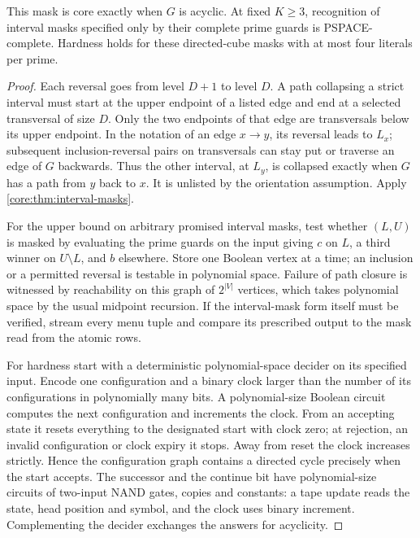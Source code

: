 \begin{proposition}
\label{core:prop:compact-cube-masks}
This mask is core exactly when $G$ is acyclic. At fixed $K\ge3$,
recognition of interval masks specified only by their complete prime
guards is PSPACE-complete. Hardness holds for these directed-cube
masks with at most four literals per prime.
\end{proposition}
\begin{proof}
Each reversal goes from level $D+1$ to level $D$. A path collapsing
a strict interval must start at the upper endpoint of a listed edge
and end at a selected transversal of size $D$. Only the two endpoints
of that edge are transversals below its upper endpoint. In the
notation of an edge $x\to y$, its reversal leads to $L_x$;
subsequent inclusion-reversal pairs on transversals can stay put
or traverse an edge of $G$ backwards. Thus the other interval, at
$L_y$, is collapsed exactly when $G$ has a path from $y$ back to
$x$. It is unlisted by the orientation assumption. Apply
\cref{core:thm:interval-masks}.

For the upper bound on arbitrary promised interval masks, test
whether $(L,U)$ is masked by evaluating the prime guards on the
input giving $c$ on $L$, a third winner on $U\setminus L$, and
$b$ elsewhere. Store one Boolean vertex at a time; an inclusion or
a permitted reversal is testable in polynomial space. Failure of
path closure is witnessed by reachability on this graph of $2^{|V|}$
vertices, which takes polynomial space by the usual midpoint
recursion. If the interval-mask form itself must be verified,
stream every menu tuple and compare its prescribed output to the
mask read from the atomic rows.

For hardness start with a deterministic polynomial-space decider
on its specified input. Encode one configuration and a binary
clock larger than the number of its configurations in polynomially
many bits. A polynomial-size Boolean circuit computes the next
configuration and increments the clock. From an accepting state
it resets everything to the designated start with clock zero;
at rejection, an invalid configuration or clock expiry it stops.
Away from reset the clock increases strictly. Hence the configuration
graph contains a directed cycle precisely when the start accepts.
The successor and the continue bit have polynomial-size circuits
of two-input NAND gates, copies and constants: a tape update reads
the state, head position and symbol, and the clock uses binary
increment. Complementing the decider exchanges the answers for
acyclicity.


\end{proof}
